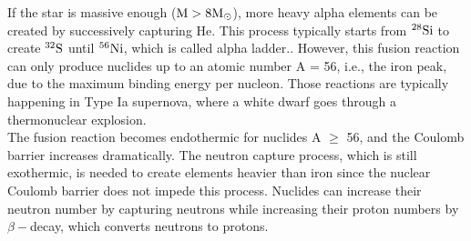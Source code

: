 \documentclass[aps,prl,preprint,groupedaddress]{revtex4}
\begin{document}
If the star is massive enough ($\rm{M >8 M_{\odot}}$), more heavy alpha elements can be created by successively capturing \rm{He}. This process typically starts from $\rm{^{28}Si}$ to create $\rm{^{32}S}$ until $\rm{^{56}Ni}$, which is called alpha ladder.\cite{Hansen2004}. However, this fusion reaction can only produce nuclides up to an atomic number \rm{A = 56}, i.e., the iron peak,  due to the maximum binding energy per nucleon. Those reactions are typically happening in Type Ia supernova, where a white dwarf goes through a thermonuclear explosion\cite{1999ApJS..125..439I}.\\

The fusion reaction becomes endothermic for nuclides A $\geq$ 56, and the Coulomb barrier increases dramatically. The neutron capture process, which is still exothermic, is needed to create elements heavier than iron since the nuclear Coulomb barrier does not impede this process. Nuclides can increase their neutron number by capturing neutrons while increasing their proton numbers by $\beta-$decay, which converts neutrons to protons.\\ 
\end{document}
